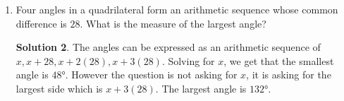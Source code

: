 \documentclass{article}
\theoremstyle{definition}
\newtheorem*{solution}{Solution}
\begin{document}
\begin{multicols}{2}
\begin{enumerate}
\begin{solution}
                The height of octagon $(AF)$ is equal to $2 + 2\sqrt{2}$.
                Read the solution to problem $5$ in the Special Right Triangles Worksheet if you do not know how we have derived this number.
                $FE = 2$.
                By the Pythagorean Theorem: $2^2 + (2 + 2\sqrt{2})^2 = (AE)^2$, so $8\sqrt{2} + 16 = (AE)^2$.
                $(AE)^2 = (AC)^2 + (CE)^2$, therefore $(AE)^2 = 2(AC)^2$.
                We are trying to find the area of the square $(AC)^2 = \frac{(AE)^2}{2} = \frac{8\sqrt{2} + 16}{2} = 4\sqrt2 + 8$ cm$^2$.
            \end{solution}
        \item Four angles in a quadrilateral form an arithmetic sequence whose common difference is $28$.
            What is the measure of the largest angle?
            \begin{solution}
                The angles can be expressed as an arithmetic sequence of $x, x + 28, x + 2(28), x + 3(28)$.
                Solving for $x$, we get that the smallest angle is $\ang{48}$.
                However the question is not asking for $x$, it is asking for the largest side which is $x + 3(28)$.
                The largest angle is $\ang{132}$.
            \end{solution}
    \end{enumerate}
\end{multicols}
\end{document}
